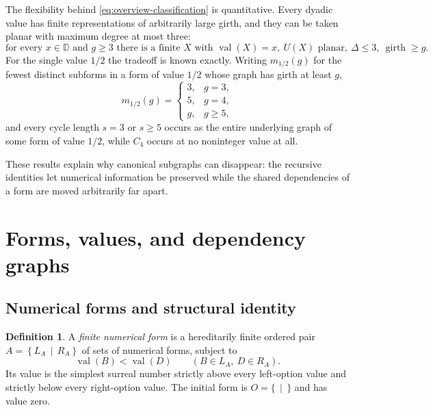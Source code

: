 \documentclass[11pt,a4paper]{article}
\numberwithin{equation}{section}
\theoremstyle{definition}
\newtheorem{definition}[theorem]{Definition}
\theoremstyle{remark}
\newcommand{\D}{\mathbb{D}}
\newcommand{\val}{\operatorname{val}}
\newcommand{\gir}{\operatorname{girth}}
\newcommand{\cut}[2]{\left\{#1\,\middle|\,#2\right\}}
\newcommand{\emptycut}{\{\,\mid\,\}}
\newcommand{\maxdeg}{\Delta}
\begin{document}
The flexibility behind \eqref{eq:overview-classification} is quantitative. Every
dyadic value has finite representations of arbitrarily large girth, and they can
be taken planar with maximum degree at most three:
\begin{equation}
\label{eq:overview-sparse}
 \text{for every }x\in\D\text{ and }g\geq3
 \text{ there is a finite }X\text{ with }\val(X)=x,\
 U(X)\text{ planar},\ \maxdeg\leq3,\ \gir\geq g .
\end{equation}
For the single value $1/2$ the tradeoff is known exactly. Writing $m_{1/2}(g)$
for the fewest distinct subforms in a form of value $1/2$ whose graph has girth
at least $g$,
\begin{equation}
\label{eq:overview-extremal}
 m_{1/2}(g)=
 \begin{cases}
  3,&g=3,\\
  5,&g=4,\\
  g,&g\geq5,
 \end{cases}
\end{equation}
and every cycle length $s=3$ or $s\geq5$ occurs as the entire underlying graph of
some form of value $1/2$, while $C_4$ occurs at no noninteger value at all.

These results explain why canonical subgraphs can disappear: the recursive
identities let numerical information be preserved while the shared dependencies
of a form are moved arbitrarily far apart.

\section{Forms, values, and dependency graphs}
\label{sec:definitions}

\subsection{Numerical forms and structural identity}

\begin{definition}
A \emph{finite numerical form} is a hereditarily finite ordered pair
$A=\cut{L_A}{R_A}$ of sets of numerical forms, subject to
\begin{equation}
 \val(B)<\val(D)\qquad(B\in L_A,\ D\in R_A).
\end{equation}
Its value is the simplest surreal number strictly above every left-option value
and strictly below every right-option value. The initial form is
$O=\emptycut$ and has value zero.
\end{definition}
\end{document}
